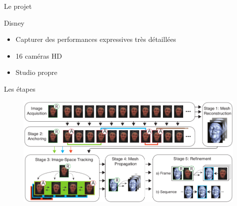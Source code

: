 \documentclass[compress,pdf,11pt,xcolor=dvipsnames]{beamer}
\begin{document}
\begin{frame}{Le projet}

  \begin{block}{Disney}
    \begin{itemize}
    \item Capturer des performances expressives très
      détaillées
    \item 16 caméras HD
    \item Studio propre
    \end{itemize}
  \end{block}
  

    
\end{frame}

\begin{frame}{Les étapes}
\begin{figure}[ht!]
  \begin{center}
    \includegraphics[width=\textwidth]{img/disney}
  \end{center}
\end{figure}
\end{frame}
\end{document}
